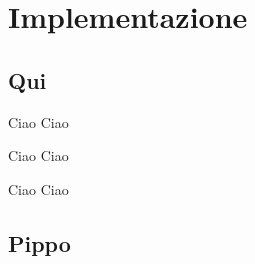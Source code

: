 \chapter{Implementazione}

\section{Qui}


Ciao Ciao

\newpage
Ciao Ciao


Ciao Ciao


\section{Pippo}




